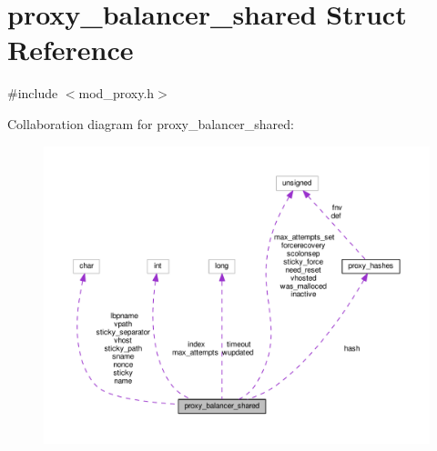 \hypertarget{structproxy__balancer__shared}{}\section{proxy\+\_\+balancer\+\_\+shared Struct Reference}
\label{structproxy__balancer__shared}


{\ttfamily \#include $<$mod\+\_\+proxy.\+h$>$}



Collaboration diagram for proxy\+\_\+balancer\+\_\+shared\+:
\nopagebreak
\begin{figure}[H]
\begin{center}
\leavevmode
\includegraphics[width=350pt]{structproxy__balancer__shared__coll__graph}
\end{center}
\end{figure}
